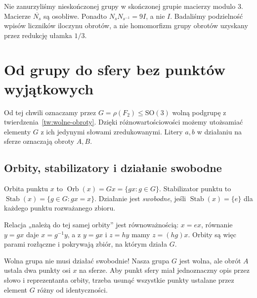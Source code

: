 \begin{uwaga}
Nie zanurzyliśmy nieskończonej grupy w skończonej grupie macierzy modulo $3$. Macierze $\overline{N_s}$ są osobliwe. Ponadto $N_sN_{s^{-1}}=9I$, a nie $I$. Badaliśmy podzielność wpisów liczników iloczynu obrotów, a nie homomorfizm grupy obrotów uzyskany przez redukcję ułamka $1/3$.
\end{uwaga}

\section{Od grupy do sfery bez punktów wyjątkowych}
Od tej chwili oznaczamy przez $G=\rho(F_2)\le\mathrm{SO}(3)$ wolną podgrupę z twierdzenia~\ref{tw:wolne-obroty}. Dzięki różnowartościowości możemy utożsamiać elementy $G$ z ich jedynymi słowami zredukowanymi. Litery $a,b$ w działaniu na sferze oznaczają obroty $A,B$.

\subsection{Orbity, stabilizatory i działanie swobodne}
\begin{definicja}
Orbita punktu $x$ to $\operatorname{Orb}(x)=Gx=\{gx:g\in G\}$. Stabilizator punktu to $\operatorname{Stab}(x)=\{g\in G:gx=x\}$. Działanie jest \emph{swobodne}, jeśli $\operatorname{Stab}(x)=\{e\}$ dla każdego punktu rozważanego zbioru.
\end{definicja}
Relacja „należą do tej samej orbity” jest równoważnością: $x=ex$, równanie $y=gx$ daje $x=g^{-1}y$, a z $y=gx$ i $z=hy$ mamy $z=(hg)x$. Orbity są więc parami rozłączne i pokrywają zbiór, na którym działa $G$.
\begin{uwaga}
Wolna grupa nie musi działać swobodnie! Nasza grupa $G$ jest wolna, ale obrót $A$ ustala dwa punkty osi $x$ na sferze. Aby punkt sfery miał jednoznaczny opis przez słowo i reprezentanta orbity, trzeba usunąć wszystkie punkty ustalane przez element $G$ różny od identyczności.
\end{uwaga}

